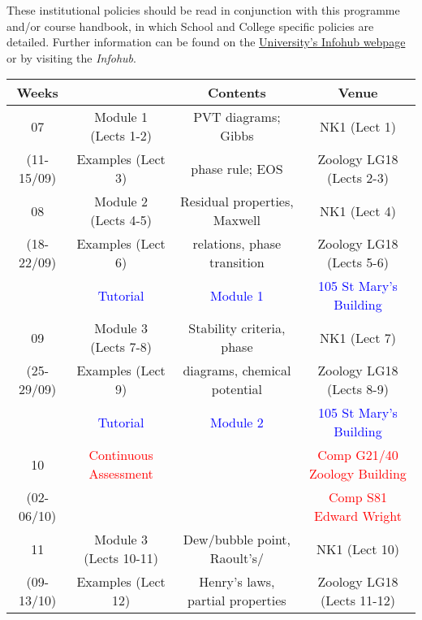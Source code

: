 \documentclass[12pts,a4paper,amsmath,amssymb,floatfix]{article}%
\newcommand{\red}{\textcolor{red}}
\newcommand{\blue}{\textcolor{blue}}
\begin{document}
These institutional policies should be read in conjunction with this programme and/or course handbook, in which School and College specific policies are detailed. Further information can be found on the \href{http:www.abdn.ac.uk/infohub/}{University's Infohub webpage} or by visiting the {\it Infohub}.


\begin{table}
  \begin{center}
    \begin{tabular}{c | c c | c}
      \hline
          {\bf Weeks}   &                          &    {\bf Contents}     &            {\bf Venue}               \\
      \hline
             07         &   Module 1 (Lects 1-2)   &  PVT diagrams; Gibbs  &            NK1  (Lect 1)             \\ 
         (11-15/09)     &   Examples (Lect 3)      &  phase rule; EOS      &            Zoology LG18 (Lects 2-3)  \\
      \hline       
             08         &   Module 2 (Lects 4-5)   &Residual properties, Maxwell &      NK1  (Lect 4)             \\ 
         (18-22/09)     &   Examples (Lect 6)      &relations, phase transition  &      Zoology LG18 (Lects 5-6)  \\
                        &   \blue{Tutorial}        &  \blue{Module 1}      &            \blue{105 St Mary's Building}\\
      \hline       
             09         &   Module 3 (Lects 7-8)   &Stability criteria, phase&            NK1  (Lect 7)             \\ 
         (25-29/09)     &   Examples (Lect 9)      &diagrams, chemical potential&      Zoology LG18 (Lects 8-9)  \\
                        &   \blue{Tutorial}        &  \blue{Module 2}      &            \blue{105 St Mary's Building}\\
      \hline       
             10         & \red{Continuous Assessment}&                     &    \red{Comp G21/40 Zoology Building}\\ 
         (02-06/10)     &                          &                       &    \red{Comp S81 Edward Wright}      \\
      \hline       
             11         &   Module 3 (Lects 10-11) &Dew/bubble point, Raoult's/&        NK1  (Lect 10)            \\ 
         (09-13/10)     &   Examples (Lect 12)     &Henry's laws, partial properties &  Zoology LG18 (Lects 11-12)\\

\end{tabular}
\end{center}
\end{table}
\end{document}

